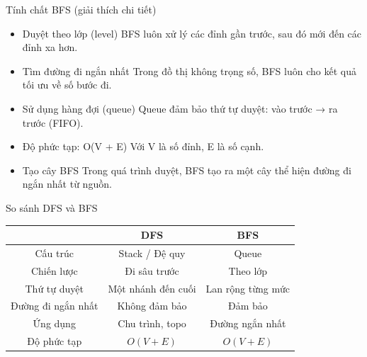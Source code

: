 \documentclass{beamer}
\newcommand{\hlblue}[1]{\textcolor{myblue}{#1}}
\newcommand{\hlgreen}[1]{\textcolor{mygreen}{#1}}
\newcommand{\hlred}[1]{\textcolor{myred}{#1}}
\newcommand{\hlpurple}[1]{\textcolor{mypurple}{#1}}
\newcommand{\hlorange}[1]{\textcolor{myorange}{#1}}
\begin{document}
\begin{frame}{Tính chất BFS (giải thích chi tiết)}

\begin{itemize}

\item \hlblue{Duyệt theo lớp (level)}  
BFS luôn xử lý các đỉnh gần trước, sau đó mới đến các đỉnh xa hơn.

\vspace{5pt}

\item \hlgreen{Tìm đường đi ngắn nhất}  
Trong đồ thị không trọng số, BFS luôn cho kết quả tối ưu về số bước đi.

\vspace{5pt}

\item \hlpurple{Sử dụng hàng đợi (queue)}  
Queue đảm bảo thứ tự duyệt: vào trước → ra trước (FIFO).

\vspace{5pt}

\item \hlred{Độ phức tạp:}  O(V + E)
Với V là số đỉnh, E là số cạnh.

\vspace{5pt}

\item \hlorange{Tạo cây BFS}  
Trong quá trình duyệt, BFS tạo ra một cây thể hiện đường đi ngắn nhất từ nguồn.

\end{itemize}

\end{frame}

\begin{frame}{So sánh DFS và BFS}

\begin{tcolorbox}

\begin{tabular}{|c|c|c|}
\hline
\textbf{} & \textbf{\hlblue{DFS}} & \textbf{\hlgreen{BFS}} \\
\hline

Cấu trúc 
& Stack / Đệ quy 
& Queue \\
\hline

Chiến lược 
& Đi \hlred{sâu} trước 
& Theo \hlblue{lớp} \\
\hline

Thứ tự duyệt 
& Một nhánh đến cuối 
& Lan rộng từng mức \\
\hline

Đường đi ngắn nhất 
& Không đảm bảo 
& \hlgreen{Đảm bảo} \\
\hline

Ứng dụng 
& Chu trình, topo 
& Đường ngắn nhất \\
\hline

Độ phức tạp 
& $O(V+E)$ 
& $O(V+E)$ \\
\hline

\end{tabular}

\end{tcolorbox}

\end{frame}
\end{document}
